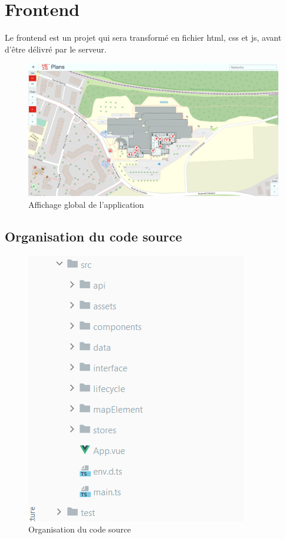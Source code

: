 \documentclass[
    iai, %
    il, %
]{heig-tb}
\begin{document}
\section{Frontend}

Le frontend est un projet qui sera transformé en fichier \gls{html}, \gls{css} et \gls{js}, avant d'être délivré par le serveur.

\begin{figure}[h]
    \centering
    \includegraphics[scale=0.3]{frontend-global.png}
    \caption{Affichage global de l'application}
\end{figure}

\subsection{Organisation du code source}

\begin{figure}[h]
    \centering
    \includegraphics[scale=0.7]{frontend-source-organisation.png}
    \caption{Organisation du code source}
    \label{fig:fichier-source}
\end{figure}
\end{document}
